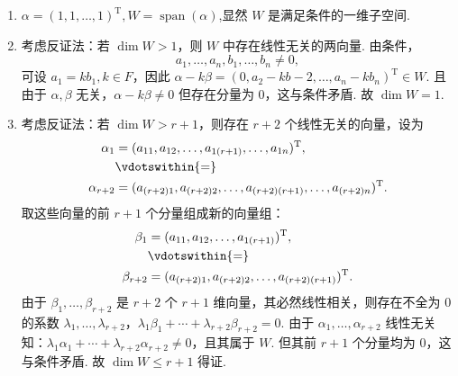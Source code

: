 \documentclass[UTF8,12pt,a4paper,fontset=fandol]{ctexart}
\begin{document}
\begin{solve}
\begin{enumerate}
                \item $\alpha=(1,1,\ldots,1)^{\mathrm{T}}, W=\operatorname{span}(\alpha)$,显然 $W$ 是满足条件的一维子空间.

                \item 考虑反证法：若 $\dim W>1$，则 $W$ 中存在线性无关的两向量. 由条件，
                      \[a_1,\ldots,a_n,b_1,\ldots,b_n\neq 0,\]
                      可设 $a_1=kb_1,k\in F$，因此 $\alpha-k\beta=(0,a_2-kb-2,\ldots,a_n-kb_n)^{\mathrm{T}}\in W$. 且由于 $\alpha,\beta$ 无关，$\alpha-k\beta\neq 0$ 但存在分量为 0，这与条件矛盾. 故 $\dim W=1$.

                \item 考虑反证法：若 $\dim W>r+1$，则存在 $r+2$ 个线性无关的向量，设为
                      \begin{align*}
                          \alpha_1     & = (a_{11},a_{12},\ldots,a_{1(r+1)},\ldots,a_{1n})^{\mathrm{T}},                 \\
                                       & \vdotswithin{ = }                                                              \\
                          \alpha_{r+2} & = (a_{(r+2)1},a_{(r+2)2},\ldots,a_{(r+2)(r+1)},\ldots,a_{(r+2)n})^{\mathrm{T}}.
                      \end{align*}
                      取这些向量的前 $r+1$ 个分量组成新的向量组：
                      \begin{align*}
                          \beta_1     & = (a_{11},a_{12},\ldots,a_{1(r+1)})^{\mathrm{T}},             \\
                                      & \vdotswithin{ = }                                            \\
                          \beta_{r+2} & = (a_{(r+2)1},a_{(r+2)2},\ldots,a_{(r+2)(r+1)})^{\mathrm{T}}.
                      \end{align*}
                      由于 $\beta_1,\ldots,\beta_{r+2}$ 是 $r+2$ 个 $r+1$ 维向量，其必然线性相关，则存在不全为 0 的系数 $\lambda_1,\ldots,\lambda_{r+2}$，$\lambda_1\beta_1+\cdots+\lambda_{r+2}\beta_{r+2}=0$.  由于 $\alpha_1,\ldots,\alpha_{r+2}$ 线性无关知：$\lambda_1\alpha_1+\cdots+\lambda_{r+2}\alpha_{r+2}\neq 0$，且其属于 $W$. 但其前 $r+1$ 个分量均为 0，这与条件矛盾. 故 $\dim W\leqslant r+1$ 得证.
            \end{enumerate}
\end{solve}
\end{document}
